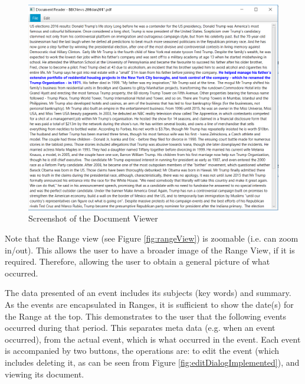 \begin{figure}[H]
\caption{Screenshot of the Document Viewer}
\label{fig:viewDocImplemented}
\includegraphics[scale=0.5]{viewDocImplemented.png}
\centering
\end{figure}

\par Note that the Range view (see Figure \ref{fig:rangeView}) is zoomable (i.e. can zoom in/out). This allows the user to have a broader image of the Range View, if it is required. Therefore, allowing the user to obtain a general picture of what occurred.

\par The data presented of an event includes its subjects (key words) and summary. As the events are encapsulated in Ranges, it is sufficient to show the date(s) for the Range at the top. This demonstrates to the user that the following events occurred during that period.  This separates meta data (e.g. when an event occurred), from the actual event, which is what occurred in the event. Each event is accompanied by two buttons, the operations are: to edit the event (which includes deleting it, as can be seen from Figure \ref{fig:editDialogImplemented}), and viewing its document.

